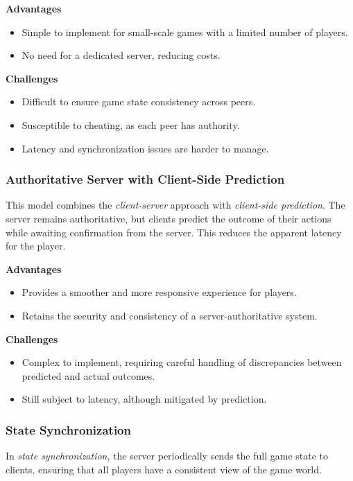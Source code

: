 \documentclass{article} %
\begin{document}
\textbf{Advantages}
\begin{itemize}
	\item Simple to implement for small-scale games with a limited number of players.
	\item No need for a dedicated server, reducing costs.
\end{itemize}

\textbf{Challenges}
\begin{itemize}
	\item Difficult to ensure game state consistency across peers.
	\item Susceptible to cheating, as each peer has authority.
	\item Latency and synchronization issues are harder to manage.
\end{itemize}

\subsubsection{Authoritative Server with Client-Side Prediction}
This model combines the \textit{client-server} approach with \textit{client-side prediction}. The server remains authoritative, but clients predict the outcome of their actions while awaiting confirmation from the server. This reduces the apparent latency for the player.

\textbf{Advantages}
\begin{itemize}
	\item Provides a smoother and more responsive experience for players.
	\item Retains the security and consistency of a server-authoritative system.
\end{itemize}

\textbf{Challenges}
\begin{itemize}
	\item Complex to implement, requiring careful handling of discrepancies between predicted and actual outcomes.
	\item Still subject to latency, although mitigated by prediction.
\end{itemize}

\subsubsection{State Synchronization}
In \textit{state synchronization}, the server periodically sends the full game state to clients, ensuring that all players have a consistent view of the game world.
\end{document}
